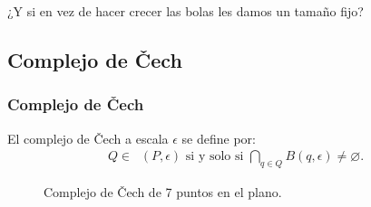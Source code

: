 \documentclass{beamer}
\DeclareMathOperator{\Cech}{\check{C}}
\begin{document}
\begin{frame}
  \begin{center}
  ¿Y si en vez de hacer crecer las bolas les damos un tamaño fijo?
  \end{center}
\end{frame}

\subsection{Complejo de \v{C}ech}

\begin{frame}\frametitle{Complejo de \v{C}ech}
  \begin{Definicion}
  El complejo de \v{C}ech a escala \(\epsilon\) se define por: 
  \begin{align*}
    Q \in \Cech(P,\epsilon)
    \text{ si y solo si }
    \bigcap_{q\in Q} B(q,\epsilon) \ne \varnothing. 
  \end{align*}
  \end{Definicion}

  \begin{figure}[H]
  \begin{columns}
    \centering
    \caption{Complejo de \v{C}ech de 7 puntos en el plano.}
  \end{columns}
  \end{figure}
\end{frame}
\end{document}
